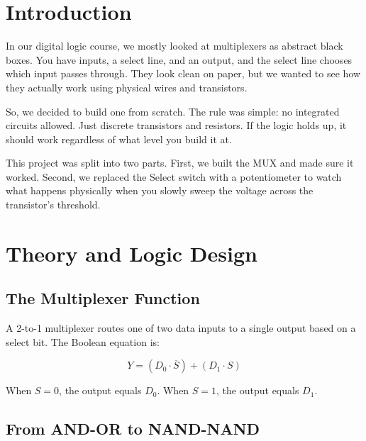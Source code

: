 \documentclass[11pt,a4paper]{article}
\begin{document}
\vspace{0.8em}
\tableofcontents
\newpage

\section{Introduction}

In our digital logic course, we mostly looked at multiplexers as abstract black boxes. You have inputs, a select line, and an output, and the select line chooses which input passes through. They look clean on paper, but we wanted to see how they actually work using physical wires and transistors.

So, we decided to build one from scratch. The rule was simple: no integrated circuits allowed. Just discrete transistors and resistors. If the logic holds up, it should work regardless of what level you build it at.

This project was split into two parts. First, we built the MUX and made sure it worked. Second, we replaced the Select switch with a potentiometer to watch what happens physically when you slowly sweep the voltage across the transistor's threshold.

\section{Theory and Logic Design}

\subsection{The Multiplexer Function}

A 2-to-1 multiplexer routes one of two data inputs to a single output based on a select bit. The Boolean equation is:

\begin{equation}
Y = (D_0 \cdot \overline{S}) + (D_1 \cdot S)
\label{eq:mux}
\end{equation}

When $S = 0$, the output equals $D_0$. When $S = 1$, the output equals $D_1$.

\subsection{From AND-OR to NAND-NAND}
\end{document}
